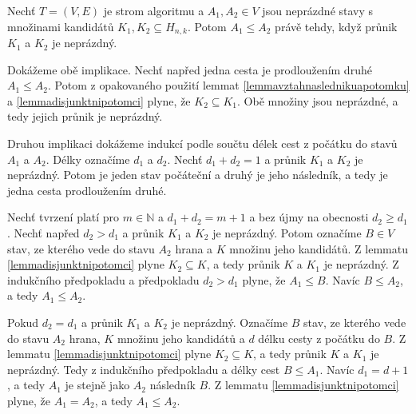 \begin{lemma}\label{lemmaprunikacestastromalg}
    Nechť $T = (V,E)$ je strom algoritmu a $A_1, A_2 \in V$ jsou neprázdné stavy s množinami kandidátů $K_1, K_2 \subseteq H_{n,k}$. Potom $A_1 \leq A_2$ právě tehdy, když průnik $K_1$ a $K_2$ je neprázdný.
\end{lemma}
\begin{dukaz}
    Dokážeme obě implikace. Nechť napřed jedna cesta je prodloužením druhé $A_1 \leq A_2$. Potom z opakovaného použití lemmat \ref{lemmavztahnaslednikuapotomku} a \ref{lemmadisjunktnipotomci} plyne, že $K_2 \subseteq K_1$. Obě množiny jsou neprázdné, a tedy jejich průnik je neprázdný. 

    Druhou implikaci dokážeme indukcí podle součtu délek cest z počátku do stavů $A_1$ a $A_2$. Délky označíme $d_1$ a $d_2$. Nechť $d_1 + d_2 = 1$ a průnik $K_1$ a $K_2$ je neprázdný. Potom je jeden stav počáteční a druhý je jeho následník, a tedy je jedna cesta prodloužením druhé.


    Nechť tvrzení platí pro $m \in \mathbb{N}$ a $d_1 + d_2 = m+1$ a bez újmy na obecnosti $d_2 \geq d_1$. Nechť napřed $d_2 > d_1$ a průnik $K_1$ a $K_2$ je neprázdný. Potom označíme $B \in V$ stav, ze kterého vede do stavu $A_2$ hrana a $K$ množinu jeho kandidátů. Z lemmatu \ref{lemmadisjunktnipotomci} plyne $K_2 \subseteq K$, a tedy průnik $K$ a $K_1$ je neprázdný. Z indukčního předpokladu a předpokladu $d_2 > d_1$ plyne, že $A_1 \leq B$. Navíc $B\leq A_2$, a tedy $A_1 \leq A_2$. 

    Pokud $d_2 = d_1$ a průnik $K_1$ a $K_2$ je neprázdný. Označíme $B$ stav, ze kterého vede do stavu $A_2$ hrana, $K$ množinu jeho kandidátů a $d$ délku cesty z počátku do $B$. Z lemmatu \ref{lemmadisjunktnipotomci} plyne $K_2 \subseteq K$, a tedy průnik $K$ a $K_1$ je neprázdný. Tedy z indukčního předpokladu a délky cest $B \leq A_1$. Navíc $d_1 = d+1$, a tedy $A_1$ je stejně jako $A_2$ následník $B$. Z lemmatu \ref{lemmadisjunktnipotomci} plyne, že $A_1 = A_2$, a tedy $A_1 \leq A_2$. 
\end{dukaz}


